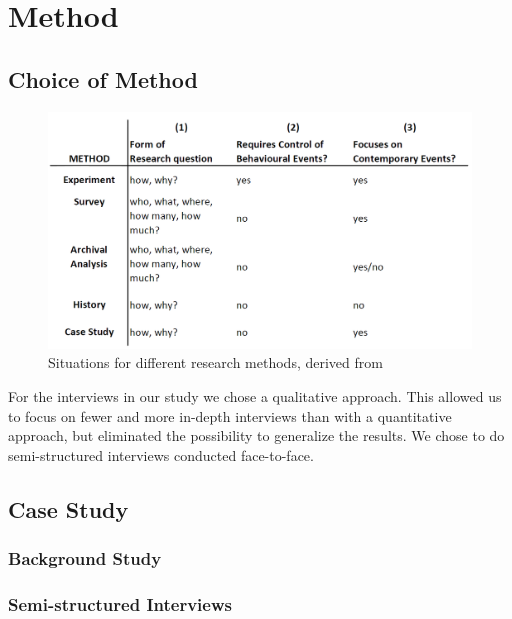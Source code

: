 \chapter{Method}

\section{Choice of Method}


\begin{figure}[h]
\begin{center}
\includegraphics[scale=0.35]{methods.png}
\caption[Situations for different research methods]{Situations for different research methods, derived from \cite{CaseStudyResearch}}
\label{fig:methods}
\end{center}
\end{figure}

For the interviews in our study we chose a qualitative approach. This allowed us to focus on fewer and more in-depth interviews than with a quantitative approach, but eliminated the possibility to generalize the results. We chose to do semi-structured interviews conducted face-to-face. 

\section{Case Study}

\subsection{Background Study}
\subsection{Semi-structured Interviews}
